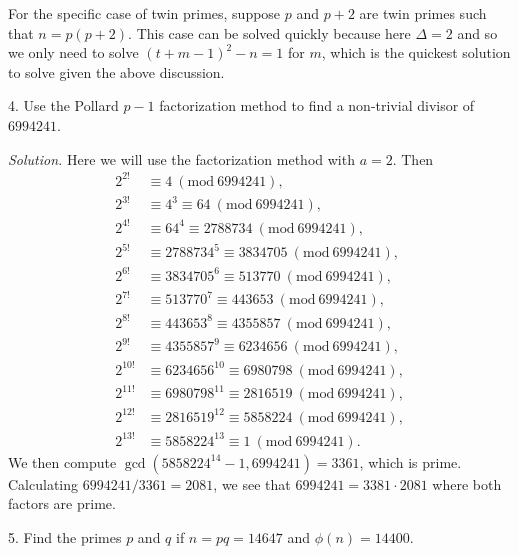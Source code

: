 \documentclass{article}
\newcommand{\Mod}[1]{\ (\mathrm{mod}\ #1)}
\begin{document}
For the specific case of twin primes, suppose $p$ and $p + 2$ are twin
primes such that $n = p(p + 2)$. This case can be solved quickly because
here $\Delta = 2$ and so we only need to solve $(t + m - 1)^2 - n = 1$
for $m$, which is the quickest solution to solve given the above discussion.

\newpage

4. Use the Pollard $p - 1$ factorization method to find a non-trivial
divisor of $6994241$.

\textit{Solution.}
Here we will use the factorization method with $a = 2$. Then
%
\begin{align*}
    2^{2!} &\equiv 4 \Mod{6994241}, \\
    2^{3!} &\equiv 4^3 \equiv 64 \Mod{6994241}, \\
    2^{4!} &\equiv 64^4 \equiv 2788734 \Mod{6994241}, \\
    2^{5!} &\equiv 2788734^5 \equiv 3834705 \Mod{6994241}, \\
    2^{6!} &\equiv 3834705^6 \equiv 513770 \Mod{6994241}, \\
    2^{7!} &\equiv 513770^7 \equiv 443653 \Mod{6994241}, \\
    2^{8!} &\equiv 443653^8 \equiv 4355857 \Mod{6994241}, \\
    2^{9!} &\equiv 4355857^9 \equiv 6234656 \Mod{6994241}, \\
    2^{10!} &\equiv 6234656^{10} \equiv 6980798 \Mod{6994241}, \\
    2^{11!} &\equiv 6980798^{11} \equiv 2816519 \Mod{6994241}, \\
    2^{12!} &\equiv 2816519^{12} \equiv 5858224 \Mod{6994241}, \\
    2^{13!} &\equiv 5858224^{13} \equiv 1 \Mod{6994241}
    .
\end{align*}
%
We then compute $\gcd(5858224^{14} - 1, 6994241) = 3361$, which is prime.
Calculating $6994241 / 3361 = 2081$, we see that $6994241 = 3381 \cdot 2081$
where both factors are prime.

\newpage

5. Find the primes $p$ and $q$ if $n = p q = 14647$ and $\phi(n) = 14400$.
\end{document}
